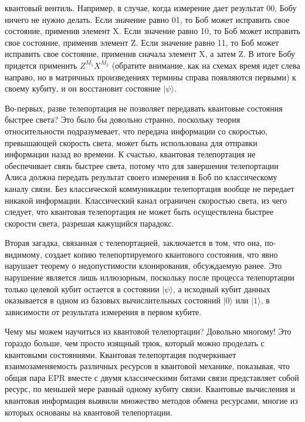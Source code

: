 \begin{multicols}{2}
{        квантовый вентиль. Например, в случае, когда измерение дает результат 00, Бобу ничего не нужно делать. Если значение равно 01, то Боб может исправить свое состояние, применив
        элемент X. Если значение равно 10, то Боб может исправить свое состояние, применив элемент Z. Если значение равно 11, то Боб может исправить свое состояние, применив сначала элемент X, а
        затем Z. В итоге Бобу придется применить $Z^{M_1}X^{M_2}$ (обратите внимание, как
        на схемах время идет слева направо, но в матричных произведениях термины справа
        появляются первыми) к своему кубиту, и он восстановит состояние $\vert\psi\rangle$.

        Во-первых, разве телепортация не позволяет передавать квантовые состояния быстрее
        света? Это было бы довольно странно, поскольку теория относительности подразумевает, что
        передача информации со скоростью, превышающей скорость света, может быть использована для отправки информации назад во времени.
        К счастью, квантовая телепортация не обеспечивает связь быстрее света,
        потому что для завершения телепортации Алиса должна передать результат своего измерения в
        Боб по классическому каналу связи. Без классической коммуникации телепортация вообще не передает никакой информации. 
        Классический канал ограничен скоростью света, из чего следует, что квантовая телепортация
        не может быть осуществлена быстрее скорости света, разрешая кажущийся парадокс.

        Вторая загадка, связанная с телепортацией, заключается в том, что она, по-видимому, создает копию телепортируемого квантового состояния, что явно нарушает теорему о недопустимости клонирования, обсуждаемую 
        ранее. Это нарушение является лишь иллюзорным, поскольку после процесса телепортации только
        целевой кубит остается в состоянии $\vert\psi\rangle$, а исходный кубит данных оказывается в одном из базовых
        вычислительных состояний $\vert0\rangle$ или $\vert1\rangle$, в зависимости от результата измерения в первом кубите.

        Чему мы можем научиться из квантовой телепортации? Довольно многому! Это гораздо больше, чем
        просто изящный трюк, который можно проделать с квантовыми состояниями. Квантовая телепортация подчеркивает
        взаимозаменяемость различных ресурсов в квантовой механике, показывая, что общая
        пара EPR вместе с двумя классическими битами связи представляет собой ресурс, по меньшей мере
        равный одному кубиту связи. Квантовые вычисления и квантовая информация
        выявили множество методов обмена ресурсами, многие из которых основаны на квантовой
        телепортации.

}
\end{multicols}

